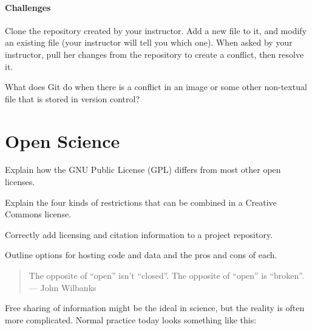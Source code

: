 \documentclass{book}
\begin{document}
\mbox{}\paragraph{Challenges}

\begin{swcenumerate}
\item
  Clone the repository created by your instructor. Add a new file to it,
  and modify an existing file (your instructor will tell you which one).
  When asked by your instructor, pull her changes from the repository to
  create a conflict, then resolve it.
\item
  What does Git do when there is a conflict in an image or some other
  non-textual file that is stored in version control?
\end{swcenumerate}

\section{Open Science}

\begin{objectives}
\begin{swcitemize}
\item
  Explain how the GNU Public License (GPL) differs from most other open
  licenses.
\item
  Explain the four kinds of restrictions that can be combined in a
  Creative Commons license.
\item
  Correctly add licensing and citation information to a project
  repository.
\item
  Outline options for hosting code and data and the pros and cons of
  each.
\end{swcitemize}
\end{objectives}

\begin{quote}
The opposite of ``open'' isn't ``closed''. The opposite of ``open'' is
``broken''. \\
--- John Wilbanks
\end{quote}

Free sharing of information might be the ideal in science, but the
reality is often more complicated. Normal practice today looks something
like this:
\end{document}
